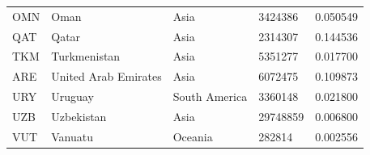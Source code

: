 \documentclass[11pt]{report}
\begin{document}
\begin{table}[h!]
\begin{tabular}{lllll}
            OMN                           & Oman                      & Asia                           & 3424386                       & 0.050549                           \\
            QAT                           & Qatar                     & Asia                           & 2314307                       & 0.144536                           \\
            TKM                           & Turkmenistan              & Asia                           & 5351277                       & 0.017700                           \\
            ARE                           & United Arab Emirates      & Asia                           & 6072475                       & 0.109873                           \\
            URY                           & Uruguay                   & South America                  & 3360148                       & 0.021800                           \\
            UZB                           & Uzbekistan                & Asia                           & 29748859                      & 0.006800                           \\
            VUT                           & Vanuatu                   & Oceania                        & 282814                        & 0.002556
        \end{tabular}
    \end{table}
\end{document}
